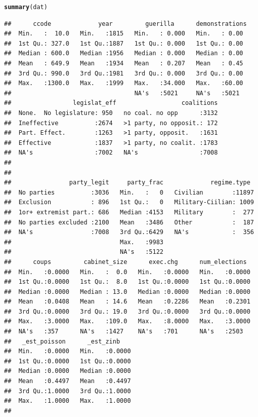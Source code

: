 \documentclass[onesided]{article}\usepackage[]{graphicx}\usepackage[]{color}
\makeatletter
\newcommand{\hlstd}[1]{\textcolor[rgb]{0.345,0.345,0.345}{#1}}%
\newcommand{\hlkwd}[1]{\textcolor[rgb]{0.737,0.353,0.396}{\textbf{#1}}}%
\newenvironment{kframe}{%
 \def\at@end@of@kframe{}%
 \ifinner\ifhmode%
  \def\at@end@of@kframe{\end{minipage}}%
  \begin{minipage}{\columnwidth}%
 \fi\fi%
 \def\FrameCommand##1{\hskip\@totalleftmargin \hskip-\fboxsep
 \colorbox{shadecolor}{##1}\hskip-\fboxsep
     \hskip-\linewidth \hskip-\@totalleftmargin \hskip\columnwidth}%
 \MakeFramed {\advance\hsize-\width
   \@totalleftmargin\z@ \linewidth\hsize
   \@setminipage}}%
 {\par\unskip\endMakeFramed%
 \at@end@of@kframe}
\newenvironment{knitrout}{}{} %
\makeatother
\begin{document}
\begin{knitrout}
\color{fgcolor}\begin{kframe}
\begin{alltt}
\hlkwd{summary}\hlstd{(dat)}
\end{alltt}
\begin{verbatim}
##      ccode             year         guerilla      demonstrations 
##  Min.   :  10.0   Min.   :1815   Min.   : 0.000   Min.   : 0.00  
##  1st Qu.: 327.0   1st Qu.:1887   1st Qu.: 0.000   1st Qu.: 0.00  
##  Median : 600.0   Median :1956   Median : 0.000   Median : 0.00  
##  Mean   : 649.9   Mean   :1934   Mean   : 0.207   Mean   : 0.45  
##  3rd Qu.: 990.0   3rd Qu.:1981   3rd Qu.: 0.000   3rd Qu.: 0.00  
##  Max.   :1300.0   Max.   :1999   Max.   :34.000   Max.   :60.00  
##                                  NA's   :5021     NA's   :5021   
##                 legislat_eff                  coalitions  
##  None.  No legislature: 950   no coal. no opp      :3132  
##  Ineffective          :2674   >1 party, no opposit.: 172  
##  Part. Effect.        :1263   >1 party, opposit.   :1631  
##  Effective            :1837   >1 party, no coalit. :1783  
##  NA's                 :7002   NA's                 :7008  
##                                                           
##                                                           
##                party_legit     party_frac             regime.type   
##  No parties          :3036   Min.   :   0   Civilian        :11897  
##  Exclusion           : 896   1st Qu.:   0   Military-Ciilian: 1009  
##  1or+ extremist part.: 686   Median :4153   Military        :  277  
##  No parties excluded :2100   Mean   :3486   Other           :  187  
##  NA's                :7008   3rd Qu.:6429   NA's            :  356  
##                              Max.   :9983                           
##                              NA's   :5122                           
##      coups         cabinet_size      exec.chg      num_elections   
##  Min.   :0.0000   Min.   :  0.0   Min.   :0.0000   Min.   :0.0000  
##  1st Qu.:0.0000   1st Qu.:  8.0   1st Qu.:0.0000   1st Qu.:0.0000  
##  Median :0.0000   Median : 13.0   Median :0.0000   Median :0.0000  
##  Mean   :0.0408   Mean   : 14.6   Mean   :0.2286   Mean   :0.2301  
##  3rd Qu.:0.0000   3rd Qu.: 19.0   3rd Qu.:0.0000   3rd Qu.:0.0000  
##  Max.   :3.0000   Max.   :109.0   Max.   :8.0000   Max.   :3.0000  
##  NA's   :357      NA's   :1427    NA's   :701      NA's   :2503    
##   _est_poisson      _est_zinb     
##  Min.   :0.0000   Min.   :0.0000  
##  1st Qu.:0.0000   1st Qu.:0.0000  
##  Median :0.0000   Median :0.0000  
##  Mean   :0.4497   Mean   :0.4497  
##  3rd Qu.:1.0000   3rd Qu.:1.0000  
##  Max.   :1.0000   Max.   :1.0000  
## 
\end{verbatim}
\end{kframe}
\end{knitrout}
\end{document}
